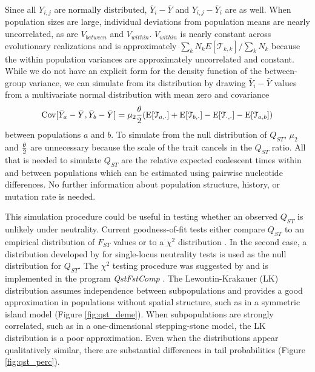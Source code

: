 Since all $Y_{i,j}$ are normally distributed, $\bar{Y}_{i} - \bar{Y}$ and
$Y_{i,j} - \bar{Y}_i$ are as well. When population sizes are large, individual
deviations from population means are nearly uncorrelated, as are $V_{between}$
and $V_{within}$. $V_{within}$ is nearly constant across evolutionary
realizations and is approximately $\sum_k N_k E[\mathcal{T}_{k,k}] / \sum_k N_k$
because the within population variances are approximately uncorrelated and
constant. While we do not have an explicit form for the density function of the
between-group variance, we can simulate from its distribution by drawing
$\bar{Y}_{i} - \bar{Y}$ values from a multivariate normal distribution with mean
zero and covariance
\begin{equation}
  \mathrm{Cov}[\bar{Y}_{a} - \bar{Y}, \bar{Y}_{b} - \bar{Y}] =
  \mu_2 \frac{\theta}{2} (\mathrm{E}[\mathcal{T}_{a,\cdot}] + \mathrm{E}[\mathcal{T}_{b,\cdot}] -
  \mathrm{E}[\mathcal{T}_{\cdot,\cdot}] - \mathrm{E}[\mathcal{T}_{a,b}])
\end{equation}
between populations $a$ and $b$. To simulate from the null distribution of
$Q_{ST}$, $\mu_2$ and $\frac{\theta}{2}$ are unnecessary because the scale of the trait
cancels in the $Q_{ST}$ ratio. All that is needed to simulate $Q_{ST}$ are the
relative expected coalescent times within and between populations which can be
estimated using pairwise nucleotide differences. No further information about
population structure, history, or mutation rate is needed.

This simulation procedure could be useful in testing whether an observed
$Q_{ST}$ is unlikely under neutrality. Current goodness-of-fit tests either
compare $Q_{ST}$ to an empirical distribution of $F_{ST}$ values or to a
$\chi^2$ distribution \citep{Leinonen2013}. In the second case, a distribution
developed by \citet{Lewontin1973} for single-locus neutrality tests is used as
the null distribution for $Q_{ST}$. The $\chi^2$ testing procedure was suggested
by \citet{Whitlock2009} and is implemented in the program \textit{QstFstComp}
\citep{Gilbert2015}. The Lewontin-Krakauer (LK) distribution assumes
independence between subpopulations and provides a good approximation in
populations without spatial structure, such as in a symmetric island model
(Figure \ref{fig:qst_deme}). When subpopulations are strongly correlated, such
as in a one-dimensional stepping-stone model, the LK distribution is a poor
approximation. Even when the distributions appear qualitatively similar, there
are substantial differences in tail probabilities (Figure \ref{fig:qst_perc}).

